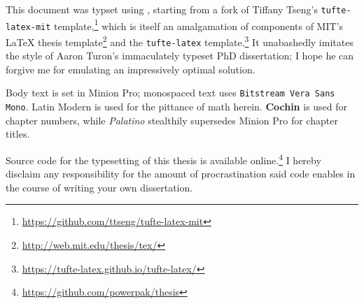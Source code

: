 
\setcounter{biburlnumpenalty}{100}
\setcounter{biburlucpenalty}{100}
\setcounter{biburllcpenalty}{100}


\begin{sloppypar}
\printbibliography[heading=bibintoc]
\end{sloppypar}


\clearpage

\vspace*{\fill}

\noindent{}

\vspace{1em}

\noindent{}This document was typset using \XeTeX, starting from a fork of Tiffany Tseng's \texttt{tufte-latex-mit} template,\footnote{\url{https://github.com/ttseng/tufte-latex-mit}} which is itself an amalgamation of components of MIT's \LaTeX{} thesis template\footnote{\url{http://web.mit.edu/thesis/tex/}} and the \texttt{tufte-latex} template.\footnote{\url{https://tufte-latex.github.io/tufte-latex/}} It unabashedly imitates the style of Aaron Turon's immaculately typeset PhD dissertation;\autocite{Turon2013} I hope he can forgive me for emulating an impressively optimal solution.

Body text is set in Minion Pro; monospaced text uses \texttt{Bitstream Vera Sans Mono}. {\selectfont{}Latin Modern} is used for the pittance of math herein. {\chapterNumberNormalSize\textbf{Cochin}} is used for chapter numbers, while {\chapterTitle\itshape Palatino} stealthily supersedes Minion Pro for chapter titles.

Source code for the typesetting of this thesis is available online.\footnote{\url{https://github.com/powerpak/thesis}} I hereby disclaim any responsibility for the amount of procrastination said code enables in the course of writing your own dissertation.